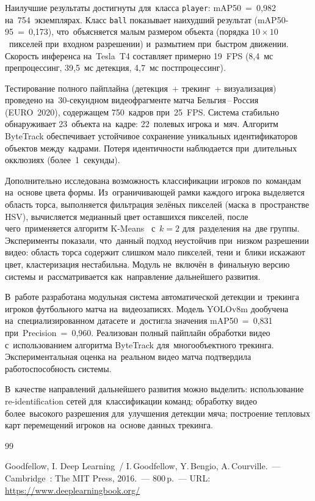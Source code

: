 \documentclass{stud-conf-pmk}
\begin{document}
\begin{paper}
Наилучшие результаты достигнуты для~класса \texttt{player}: mAP50~=~0{,}982 на~754~экземплярах. Класс \texttt{ball} показывает наихудший результат (mAP50-95~=~0{,}173), что~объясняется малым размером объекта (порядка $10 \times 10$~пикселей при~входном разрешении) и~размытием при~быстром движении. Скорость инференса на~Tesla~T4 составляет примерно 19~FPS (8{,}4~мс препроцессинг, 39{,}5~мс детекция, 4{,}7~мс постпроцессинг).

Тестирование полного пайплайна (детекция~+ трекинг~+ визуализация) проведено на~30-секундном видеофрагменте матча Бельгия\,--\,Россия (EURO~2020), содержащем 750~кадров при~25~FPS. Система стабильно обнаруживает 23~объекта на~кадре: 22~полевых игрока и~мяч. Алгоритм ByteTrack обеспечивает устойчивое сохранение уникальных идентификаторов объектов между~кадрами. Потеря идентичности наблюдается при~длительных окклюзиях (более~1~секунды).

Дополнительно исследована возможность классификации игроков по~командам на~основе цвета формы. Из~ограничивающей рамки каждого игрока выделяется область торса, выполняется фильтрация зелёных пикселей (маска в~пространстве HSV), вычисляется медианный цвет оставшихся пикселей, после чего~применяется алгоритм K-Means~\cite{bib_kmeans} с~$k=2$ для~разделения на~две группы. Эксперименты показали, что~данный подход неустойчив при~низком разрешении видео: область торса содержит слишком мало пикселей, тени и~блики искажают цвет, кластеризация нестабильна. Модуль не~включён в~финальную версию системы и~рассматривается как~направление дальнейшего развития.

\conclusion

В~работе разработана модульная система автоматической детекции и~трекинга игроков футбольного матча на~видеозаписях. Модель YOLOv8m дообучена на~специализированном датасете и~достигла значения mAP50~=~0{,}831 при~Precision~=~0{,}960. Реализован полный пайплайн обработки видео с~использованием алгоритма ByteTrack для~многообъектного трекинга. Экспериментальная оценка на~реальном видео матча подтвердила работоспособность системы.

В~качестве направлений дальнейшего развития можно выделить: использование re-identification сетей для~классификации команд; обработку видео более~высокого разрешения для~улучшения детекции мяча; построение тепловых карт перемещений игроков на~основе данных трекинга.

\begin{thebibliography}{99}

Goodfellow, I. Deep Learning~/ I.\,Goodfellow, Y.\,Bengio, A.\,Courville.~--- Cambridge~: The MIT Press, 2016.~--- 800\,p.~--- URL: \url{https://www.deeplearningbook.org/}


\end{thebibliography}
\end{paper}
\end{document}
